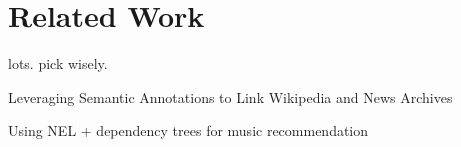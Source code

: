 \chapter{Related Work}\label{chap:relatedwork}
lots. pick wisely.

Leveraging Semantic Annotations to Link Wikipedia and News Archives\cite{Mishra2016}

Using NEL + dependency trees for music recommendation\cite{Sordo2015}
